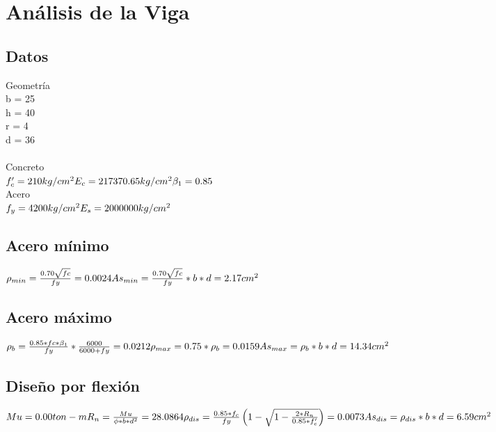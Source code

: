 \documentclass{article}%
\begin{document}
%
\normalsize%
\section{Análisis de la Viga}%
\label{sec:AnlisisdelaViga}%
\subsection{Datos}%
\label{subsec:Datos}%
Geometría \\b = 25 \\  h = 40 \\ r = 4 \\  d = 36 \\ \\Concreto \\$ f'_{c} = 210kg/cm^{2} \\E_{c} = 217370.65kg/cm^{2} \\\beta_{1} = 0.85\\ $\\Acero \\ $ f_{y} = 4200kg/cm^{2} \\E_{s} = 2000000kg/cm^{2} $ 

%
\subsection{Acero mínimo}%
\label{subsec:Aceromnimo}%
$ \rho_{min} = \frac{0.70 \sqrt{fc}}{fy} = 0.0024\\As_{min} = \frac{0.70 \sqrt{fc}}{fy}*b*d = 2.17cm^{2} $ \\

%
\subsection{Acero máximo}%
\label{subsec:Aceromximo}%
$ \rho_{b} = \frac{0.85 * fc * \beta_{1}} {fy} * \frac{6000}{6000+fy} = 0.0212\\\rho_{max} = 0.75*\rho_{b} = 0.0159\\As_{max} = \rho_{b}*b*d = 14.34cm^{2} $ \\

%
\subsection{Diseño por flexión}%
\label{subsec:Diseoporflexin}%
$ Mu = 0.00ton-m \\ R_{n} = \frac{Mu}{\phi*b*d^{2}} = 28.0864\\ \rho_{dis} = \frac {0.85*f_{c}}{fy} \left( 1 - \sqrt{1- \frac{2*R_{n}}{0.85*f'_{c}}}  \right) = 0.0073  \\ As_{dis} = \rho_{dis}*b*d = 6.59cm^{2} \\ $
\end{document}
